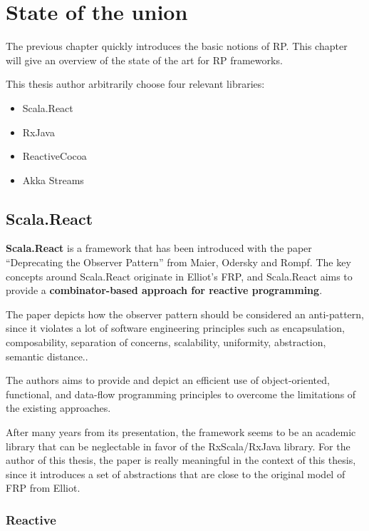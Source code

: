 \chapter{State of the union}\label{state-of-the-union}

The previous chapter quickly introduces the basic notions of RP. This
chapter will give an overview of the state of the art for RP frameworks.

This thesis author arbitrarily choose four relevant libraries:

\begin{itemize}
\itemsep1pt\parskip0pt
\item
  Scala.React
\item
  RxJava
\item
  ReactiveCocoa
\item
  Akka Streams
\end{itemize}

\section{Scala.React}\label{scala.react}

\textbf{Scala.React} is a framework that has been introduced with the
paper ``Deprecating the Observer Pattern'' from Maier, Odersky and
Rompf. The key concepts around Scala.React originate in Elliot's FRP,
and Scala.React aims to provide a \textbf{combinator-based approach for
reactive programming}.

The paper depicts how the observer pattern should be considered an
anti-pattern, since it violates a lot of software engineering principles
such as encapsulation, composability, separation of concerns,
scalability, uniformity, abstraction, semantic distance..

The authors aims to provide and depict an efficient use of
object-oriented, functional, and data-flow programming principles to
overcome the limitations of the existing approaches.

After many years from its presentation, the framework seems to be an
academic library that can be neglectable in favor of the RxScala/RxJava
library. For the author of this thesis, the paper is really meaningful
in the context of this thesis, since it introduces a set of abstractions
that are close to the original model of FRP from Elliot.

\subsection{Reactive}\label{reactive}

